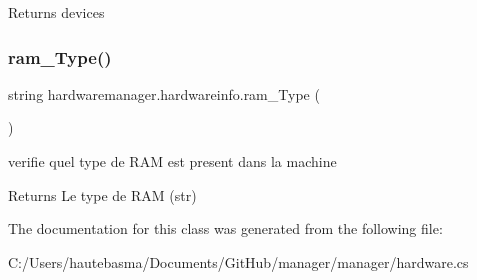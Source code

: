 \begin{DoxyReturn}{Returns}
devices
\end{DoxyReturn}
\mbox{\label{classhardwaremanager_1_1hardwareinfo_af9c922475681b3b40c53ad13f5556ad1}} 
\subsubsection{\texorpdfstring{ram\+\_\+\+Type()}{ram\_Type()}}
{\footnotesize\ttfamily string hardwaremanager.\+hardwareinfo.\+ram\+\_\+\+Type (\begin{DoxyParamCaption}{ }\end{DoxyParamCaption})}



verifie quel type de R\+AM est present dans la machine 

\begin{DoxyReturn}{Returns}
Le type de R\+AM (str)
\end{DoxyReturn}


The documentation for this class was generated from the following file\+:\begin{DoxyCompactItemize}
\item 
C\+:/\+Users/hautebasma/\+Documents/\+Git\+Hub/manager/manager/hardware.\+cs\end{DoxyCompactItemize}

